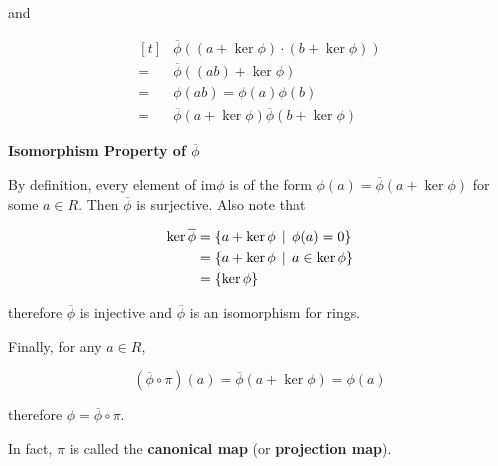\documentclass[a4paper,12pt]{article}
\begin{document}
\begin{thm}
\begin{alist}
    and

    $$\begin{aligned}[t]
      &\overline{\phi}((a+\ker\phi)\cdot(b+\ker\phi))\\
      =&\overline{\phi}((ab)+\ker\phi)\\
      =&\phi(ab)=\phi(a)\phi(b)\\
      =&\overline{\phi}(a+\ker\phi)\overline{\phi}(b+\ker\phi)
    \end{aligned}$$

    \item \textbf{Isomorphism Property of $\overline{\phi}$}\n

    By definition, every element of $\mathrm{im}\phi$ is of the form $\phi(a)=\overline{\phi}(a+\ker\phi)$ for some $a\in R$. Then $\overline{\phi}$ is surjective. Also note that

    $$\begin{aligned}[t]
      \ker\overline{\phi}&=\left\{ a+\ker\phi\,\mid\,\phi(a)=0\right\}\\
      &=\left\{ a+\ker\phi\,\mid\, a\in\ker\phi\right\}\\
      &=\left\{ \ker\phi\right\}
    \end{aligned}$$\s

    therefore $\overline{\phi}$ is injective and $\overline{\phi}$ is an isomorphism for rings.
  \end{alist}

  Finally, for any $a\in R$,

  $$(\overline{\phi}\circ\pi)(a)=\overline{\phi}(a+\ker\phi)=\phi(a)$$\s

  therefore $\phi=\overline{\phi}\circ\pi$.
\end{thm}

In fact, $\pi$ is called the \textbf{canonical map} (or \textbf{projection map}).\n
\end{document}
